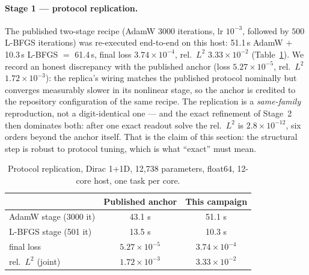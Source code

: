 \documentclass[11pt,a4paper]{article}
\theoremstyle{plain}
\theoremstyle{definition}
\begin{document}
\paragraph{Stage 1 --- protocol replication.}
The published two-stage recipe (AdamW $3000$ iterations, lr $10^{-3}$,
followed by $500$ L-BFGS iterations) was re-executed end-to-end on this host:
51.1\,s AdamW $+$ 10.3\,s L-BFGS $=$ 61.4\,s, final loss
$3.74\times10^{-4}$, rel.\ $L^2$ $3.33\times10^{-2}$
(Table~\ref{tab:case-protocol}).  We record an honest discrepancy with the
published anchor (loss $5.27\times10^{-5}$, rel.\ $L^2$
$1.72\times10^{-3}$): the replica's wiring matches the published protocol
nominally but converges measurably slower in its nonlinear stage, so the
anchor is credited to the repository configuration of the same recipe.
The replication is a \emph{same-family} reproduction, not a
digit-identical one --- and the exact refinement of Stage~2 then
dominates both: after one exact readout solve the rel.\ $L^2$ is
$2.8\times10^{-12}$, six orders beyond the anchor itself.  That is the
claim of this section: the structural step is robust to protocol tuning,
which is what ``exact'' must mean.

\begin{table}[h]
\centering
\caption{Protocol replication, Dirac 1+1D, 12{,}738 parameters, float64,
12-core host, one task per core.}
\begin{tabular}{lcc}
\toprule
 & \textbf{Published anchor} & \textbf{This campaign} \\
\midrule
AdamW stage (3000 it)   & 43.1 s & 51.1 s \\
L-BFGS stage (501 it)   & 13.5 s & 10.3 s \\
final loss              & $5.27\times10^{-5}$ & $3.74\times10^{-4}$ \\
rel.\ $L^2$ (joint)     & $1.72\times10^{-3}$ & $3.33\times10^{-2}$ \\
\bottomrule
\end{tabular}
\label{tab:case-protocol}
\end{table}
\end{document}
